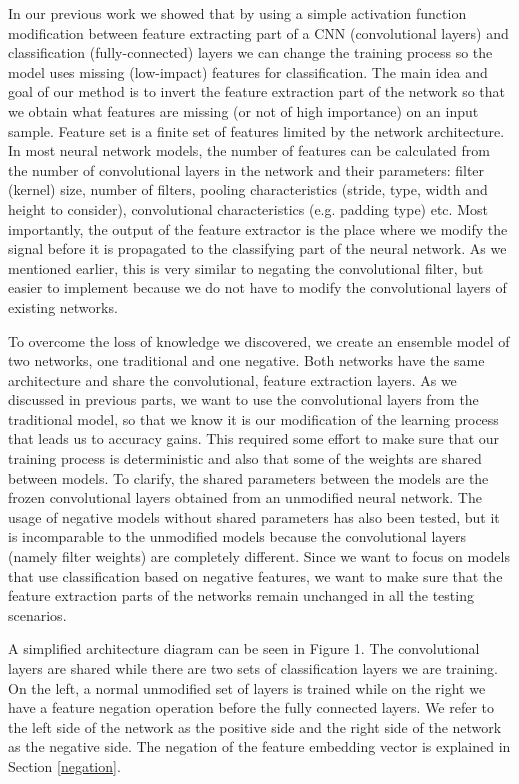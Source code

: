 \documentclass[b5paper]{book}
\let\cite\parencite
\begin{document}
In our previous work \cite{milovsevic2019classification} we showed that by using a simple activation function modification between feature extracting part of a CNN (convolutional layers) and classification (fully-connected) layers we can change the training process so the model uses missing (low-impact) features for classification. The main idea and goal of our method is to invert the feature extraction part of the network so that we obtain what features are missing (or not of high importance) on an input sample. Feature set is a finite set of features limited by the network architecture. In most neural network models, the number of features can be calculated from the number of convolutional layers in the network and their parameters: filter (kernel) size, number of filters, pooling characteristics (stride, type, width and height to consider), convolutional characteristics (e.g. padding type) etc. Most importantly, the output of the feature extractor is the place where we modify the signal before it is propagated to the classifying part of the neural network. As we mentioned earlier, this is very similar to negating the convolutional filter, but easier to implement because we do not have to modify the convolutional layers of existing networks.

To overcome the loss of knowledge we discovered, we create an ensemble model of two networks, one traditional and one negative. Both networks have the same architecture and share the convolutional, feature extraction layers. As we discussed in previous parts, we want to use the convolutional layers from the traditional model, so that we know it is our modification of the learning process that leads us to accuracy gains. This required some effort to make sure that our training process is deterministic and also that some of the weights are shared between models. To clarify, the shared parameters between the models are the frozen convolutional layers obtained from an unmodified neural network. The usage of negative models without shared parameters has also been tested, but it is incomparable to the unmodified models because the convolutional layers (namely filter weights) are completely different. Since we want to focus on models that use classification based on negative features, we want to make sure that the feature extraction parts of the networks remain unchanged in all the testing scenarios.

A simplified architecture diagram can be seen in Figure 1. The convolutional layers are shared while there are two sets of classification layers we are training. On the left, a normal unmodified set of layers is trained while on the right we have a feature negation operation before the fully connected layers. We refer to the left side of the network as the positive side and the right side of the network as the negative side. The negation of the feature embedding vector is explained in Section \ref{negation}.
\end{document}
